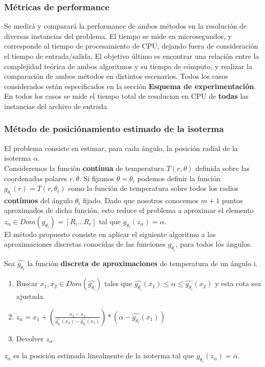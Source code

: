 \subsubsection{Métricas de performance}

Se medir\'a y comparar\'a la performance de ambos m\'etodos en la resoluci\'on de diversas instancias del problema. El tiempo se mide en microsegundos, y corresponde al tiempo de procesamiento de CPU, dejando fuera de consideraci\'on el tiempo de entrada/salida. El objetivo \'ultimo es encontrar una relaci\'on entre la complejidad te\'orica de ambos algoritmos y su tiempo de c\'omputo, y realizar la comparaci\'on de ambos m\'etodos en distintos escenarios. Todos los casos considerados est\'an especificados en la secci\'on \textbf{Esquema de experimentaci\'on}. En todos los casos se mide el tiempo total de resolucion en CPU de \textbf{todas} las instancias del archivo de entrada.

\subsubsection{Método de posiciónamiento estimado de la isoterma}
El problema consiste en estimar, para cada ángulo, la posición radial de la isoterma \texttt{$\alpha$}.\\
Consideremos la función \textbf{contínua} de temperatura $T(r,\theta)$ definida sobre las coordenadas polares $r,\theta$. Si fijamos $\theta = \theta_i$ podemos definir la función $g_{\theta_i}(r) = T(r,\theta_i)$ como la función de temperatura sobre todos los radios \textbf{contínuos} del ángulo $\theta_i$ fijado. Dado que nosotros conocemos $m+1$ puntos aproximados de dicha función, esto reduce el problema a aproximar el elemento $ z_\alpha \in Dom(g_{\theta_i}) = { [R_i \dots R_e] }$ tal que $g_{\theta_i}(z_\alpha) = \alpha$. \\
El método propuesto consiste en aplicar el siguiente algoritmo a las aproximaciones discretas conocidas de las funciones $g_{\theta_i}$, para todos los ángulos.

\begin{algoritmo}
    Sea $\hat{g_{\theta_i}}$ la función \textbf{discreta de aproximaciones} de temperatura de un ángulo i.
    \begin{enumerate}
        \item Buscar $ x_1, x_2 \in Dom(\hat{g_{\theta_i}}) $ tales que $ \hat{g_{\theta_i}}(x_1) \leq \alpha \leq \hat{g_{\theta_i}}(x_2)$ y esta cota sea ajustada.
        
        \item $z_\alpha = x_1 + \left(\frac{x_2 - x_1}{\hat{g_{\theta_i}}(x_2) - \hat{g_{\theta_i}}(x_1)}\right) * (\alpha - \hat{g_{\theta_i}}(x_1))$

        \item Devolver $z_\alpha$.
    \end{enumerate}
    $z_\alpha$ es la posición estimada linealmente de la isoterma tal que $g_{\theta_i}(z_\alpha) = \alpha$.
\end{algoritmo}

